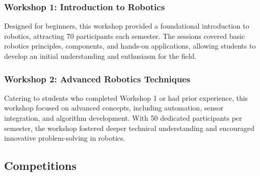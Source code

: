 \documentclass[11pt, twocolumn]{article}
\begin{document}
\newpage
\subsubsection{Workshop 1: Introduction to Robotics}
Designed for beginners, this workshop provided a foundational introduction to robotics, attracting 70 participants each semester. The sessions covered basic robotics principles, components, and hands-on applications, allowing students to develop an initial understanding and enthusiasm for the field.



\subsubsection{Workshop 2: Advanced Robotics Techniques}
Catering to students who completed Workshop 1 or had prior experience, this workshop focused on advanced concepts, including automation, sensor integration, and algorithm development. With 50 dedicated participants per semester, the workshop fostered deeper technical understanding and encouraged innovative problem-solving in robotics. 

\subsection{Competitions} 
\end{document}
